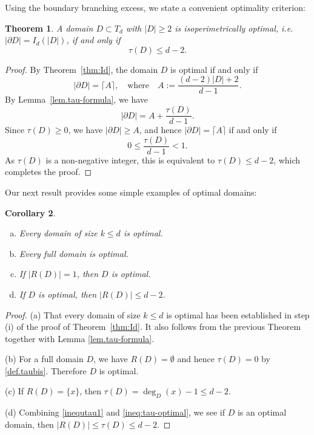 \documentclass[a4paper, 11pt]{article}
\numberwithin{equation}{section}
\newtheorem{theorem}{Theorem}[section]
\newtheorem{corollary}[theorem]{Corollary}
\theoremstyle{definition}
\theoremstyle{remark}
\begin{document}
\medskip 

Using the boundary branching excess, we state a convenient optimality criterion: 
\begin{theorem}\label{CritereIsop}
A domain $D\subset T_d$ with $|D|\ge 2$ is isoperimetrically optimal,   i.e.\ $|\partial D|=I_d(|D|)$,  if and only if
\begin{equation}\label{ineq:tau-optimal}
   \tau(D) \leq  d-2.
\end{equation}
\end{theorem}

\medskip 

\begin{proof}
By Theorem~\ref{thm:Id}, the domain $D$ is optimal if and only if
\[
 |\partial D| = \lceil A\rceil,
 \quad \text{where} \quad
 A := \frac{(d-2)|D|+2}{d-1}.
\]
By Lemma~\ref{lem.tau-formula}, we have
\[
  |\partial D|   =   A + \frac{\tau(D)}{d-1}.
\]
Since $\tau(D)\ge 0$, we have $|\partial D|\ge A$, and hence
$|\partial D|=\lceil A\rceil$ if and only if
\[
 0 \le \frac{\tau(D)}{d-1} < 1.
\]
As $\tau(D)$ is a non-negative integer, this is equivalent to
$\tau(D)\le d-2$, which completes the proof.
\end{proof}



 

\medskip  

Our next result provides some simple examples of optimal domains: 
%
\begin{corollary}\label{CorcritereIsop}
\begin{enumerate}[(a)]
\item Every domain of size $k\le d$ is optimal.
\item Every full domain is optimal. 
\item If  $|R(D)| = 1$, then $D$ is optimal.
\item If $D$ is optimal, then $|R(D)|\le d-2$.
\end{enumerate}
\end{corollary}

\medskip 

\begin{proof}
(a) That every domain of size $k\le d$ is optimal has been established in step (i) of the proof  of Theorem~\ref{thm:Id}.
It also follows from  the previous Theorem together with Lemma \ref{lem.tau-formula}. 

\medskip 

(b) For a full domain $D$,  we have $R(D) = \emptyset$ and hence $\tau(D)=0$ 
by \eqref{def.taubis}. Therefore $D$ is optimal.

\medskip 

(c)  If $R(D)=\{x\}$, then $\tau(D)=\deg_D(x)-1\le d-2$.

\medskip 

(d) Combining \eqref{inequtau1} and \eqref{ineq:tau-optimal}, we see if $D$ is an optimal domain, then  $|R(D)|\leq  \tau(D) \leq  d-2$.
\end{proof}
 
\end{document}
